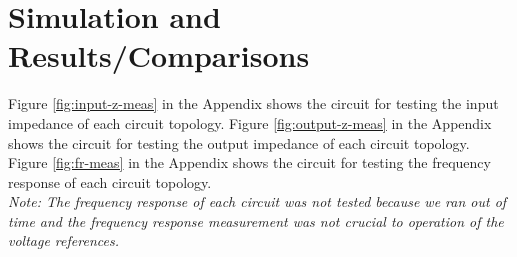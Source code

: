 \documentclass[conference]{IEEEtran}
\begin{document}
\section{Simulation and Results/Comparisons}
Figure \ref{fig:input-z-meas} in the Appendix shows the circuit for testing the input impedance of each circuit topology.  Figure \ref{fig:output-z-meas} in the Appendix shows the circuit for testing the output impedance of each circuit topology.  Figure \ref{fig:fr-meas} in the Appendix shows the circuit for testing the frequency response of each circuit topology.\\
\emph{Note: The frequency response of each circuit was not tested because we ran out of time and the frequency response measurement was not crucial to operation of the voltage references.}
\end{document}
